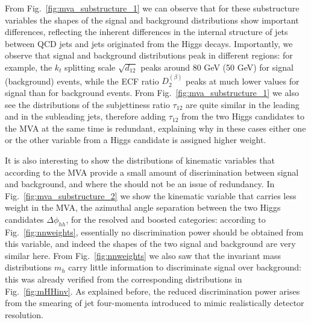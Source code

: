 From Fig.~\ref{fig:mva_substructure_1}
we can observe that for these substructure variables the shapes of the signal
and background distributions show important differences,
reflecting the inherent differences in the internal structure of jets
between QCD jets and jets originated from the Higgs decays.
%
Importantly, we observe that signal and background distributions peak
in different regions: for example, the $k_t$ splitting scale $\sqrt{d_{12}}$
peaks around 80 GeV (50 GeV) for signal (background) events, while
the ECF ratio $D_2^{(\beta)}$ peaks at much lower values for signal than
for background events.
%
From Fig.~\ref{fig:mva_substructure_1} we also see
the distributions of the subjettiness ratio $\tau_{12}$ are quite similar
in the leading and in the subleading jets, therefore adding
$\tau_{12}$ from the two Higgs candidates to the MVA at the same time
is redundant, explaining why in these cases either one or the other
variable from a Higgs candidate is assigned higher weight.


It is also interesting to show the distributions of kinematic variables
that according to the MVA provide a small amount of discrimination
between signal and background, and where the should not be an issue
of redundancy.
%
In Fig.~\ref{fig:mva_substructure_2}
we show the kinematic variable that carries less weight in the MVA,
    the azimuthal angle separation between the two Higgs candidates
    $\Delta\phi_{hh}$, for the resolved and boosted categories:
    according to Fig.~\ref{fig:nnweights}, essentially no discrimination power
    should be obtained from this variable, and indeed the shapes of the two signal
    and background
    are very similar here.
    From Fig.~\ref{fig:nnweights} we also saw that the
    invariant mass distributions $m_h$ carry little information
    to discriminate signal over background:
    this was already verified from 
the corresponding
distributions in Fig.~\ref{fig:mHHinv}.
%
As explained before, the reduced discrimination power arises
from 
the  smearing of jet four-momenta introduced to mimic
realistically detector resolution.

